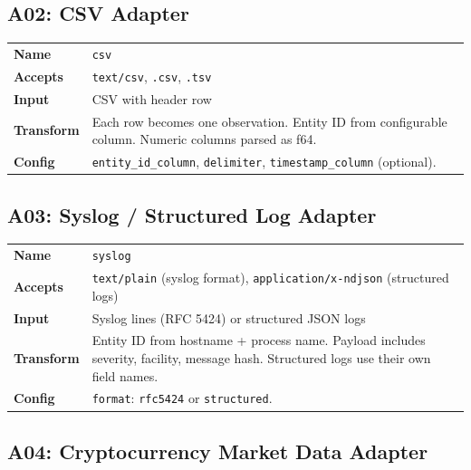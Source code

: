 \documentclass[11pt,a4paper,twoside]{article}
\theoremstyle{definition}
\theoremstyle{plain}
\theoremstyle{remark}
\begin{document}
\subsection{A02: CSV Adapter}

\begin{tabularx}{\textwidth}{l X}
\toprule
\textbf{Name} & \texttt{csv} \\
\textbf{Accepts} & \texttt{text/csv}, \texttt{.csv}, \texttt{.tsv} \\
\textbf{Input} & CSV with header row \\
\textbf{Transform} & Each row becomes one observation. Entity ID from
  configurable column. Numeric columns parsed as f64. \\
\textbf{Config} & \texttt{entity\_id\_column}, \texttt{delimiter},
  \texttt{timestamp\_column} (optional). \\
\bottomrule
\end{tabularx}

\subsection{A03: Syslog / Structured Log Adapter}

\begin{tabularx}{\textwidth}{l X}
\toprule
\textbf{Name} & \texttt{syslog} \\
\textbf{Accepts} & \texttt{text/plain} (syslog format),
  \texttt{application/x-ndjson} (structured logs) \\
\textbf{Input} & Syslog lines (RFC 5424) or structured JSON logs \\
\textbf{Transform} & Entity ID from hostname + process name. Payload
  includes severity, facility, message hash. Structured logs use
  their own field names. \\
\textbf{Config} & \texttt{format}: \texttt{rfc5424} or
  \texttt{structured}. \\
\bottomrule
\end{tabularx}

\subsection{A04: Cryptocurrency Market Data Adapter}
\end{document}
